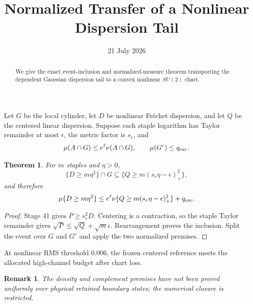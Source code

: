 \documentclass[11pt]{article}\usepackage[margin=1in]{geometry}\usepackage{amsmath,amsthm}\newtheorem{theorem}{Theorem}\newtheorem{remark}{Remark}
\title{Normalized Transfer of a Nonlinear Dispersion Tail}\author{}\date{21 July 2026}
\begin{document}
\maketitle
\begin{abstract}We give the exact event-inclusion and normalized-measure theorem transporting the dependent Gaussian dispersion tail to a convex nonlinear $SU(2)$ chart.\end{abstract}
Let $G$ be the local cylinder, let $D$ be nonlinear Fr\'echet dispersion, and let $Q$ be the centered linear dispersion. Suppose each staple logarithm has Taylor remainder at most $\epsilon$, the metric factor is $s_r$, and
\[\mu(A\cap G)\le e^\ell\nu(A\cap G),\qquad \mu(G^c)\le q_{\rm exc}.\]
\begin{theorem}For $m$ staples and $\eta>0$,
\[\{D\ge m\eta^2\}\cap G\subseteq\{Q\ge m(s_r\eta-\epsilon)_+^2\},\]
and therefore
\[\mu\{D\ge m\eta^2\}\le e^\ell\nu\{Q\ge m(s_r\eta-\epsilon)_+^2\}+q_{\rm exc}.\]
\end{theorem}
\begin{proof}Stage 41 gives $P\ge s_r^2D$. Centering is a contraction, so the staple Taylor remainder gives $\sqrt P\le\sqrt Q+\sqrt m\epsilon$. Rearrangement proves the inclusion. Split the event over $G$ and $G^c$ and apply the two normalized premises.\end{proof}
At nonlinear RMS threshold $0.006$, the frozen centered reference meets the allocated high-channel budget after chart loss.
\begin{remark}The density and complement premises have not been proved uniformly over physical retained boundary states; the numerical closure is restricted.\end{remark}
\end{document}
